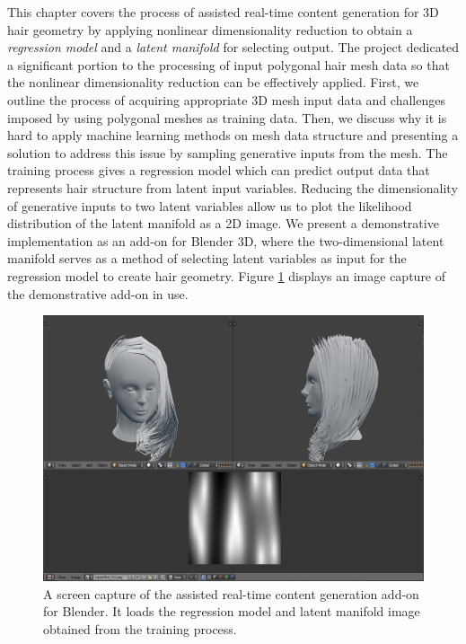 \documentclass[ %
author={Dillon Keith Diep},
supervisor={Dr. Carl Henrik Ek},
degree={MEng},
title={ART-CG Hair:},
subtitle={Assisted Real-time Content Generation of Stylised Virtual Hair},
type={Research},
year={2017} ]{dissertation}
\begin{document}
This chapter covers the process of assisted real-time content generation for 3D hair geometry by applying nonlinear dimensionality reduction to obtain a \textit{regression model} and a \textit{latent manifold} for selecting output. The project dedicated a significant portion to the processing of input polygonal hair mesh data so that the nonlinear dimensionality reduction can be effectively applied. First, we outline the process of acquiring appropriate 3D mesh input data and challenges imposed by using polygonal meshes as training data. Then, we discuss why it is hard to apply machine learning methods on mesh data structure and presenting a solution to address this issue by sampling generative inputs from the mesh. The training process gives a regression model which can predict output data that represents hair structure from latent input variables. Reducing the dimensionality of generative inputs to two latent variables allow us to plot the likelihood distribution of the latent manifold as a 2D image. We present a demonstrative implementation as an add-on for Blender 3D, where the two-dimensional latent manifold serves as a method of selecting latent variables as input for the regression model to create hair geometry. Figure \ref{latentAddon} displays an image capture of the demonstrative add-on in use.

\begin{figure}[!h]
	\centering
	\includegraphics[scale=0.3]{images/latentHairAddon}
	\caption{A screen capture of the assisted real-time content generation add-on for Blender. It loads the regression model and latent manifold image obtained from the training process.}
	\label{latentAddon}
\end{figure}
\end{document}
